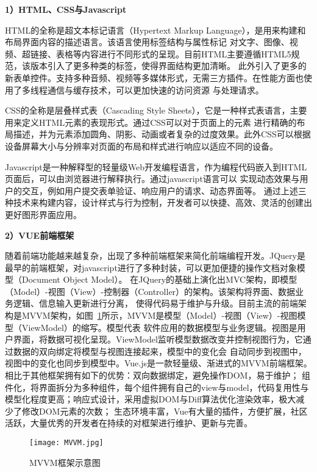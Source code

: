 \textbf{1）HTML、CSS与Javascript}

HTML的全称是超文本标记语言（Hypertext Markup Language），是用来构建和布局界面内容的描述语言。该语言使用标签结构与属性标记
对文字、图像、视频、超链接、表格等内容进行不同形式的呈现。目前HTML主要遵循HTML5规范，该版本引入了更多种类的标签，使得界面结构更加清晰。
此外引入了更多的新表单控件。支持多种音频、视频等多媒体形式，无需三方插件。在性能方面也使用了多线程通信与缓存技术，可以更加快速的访问资源
与处理请求。

CSS的全称是层叠样式表（Cascading Style Sheets），它是一种样式表语言，主要用来定义HTML元素的表现形式。通过CSS可以对于页面上的元素
进行精确的布局描述，并为元素添加圆角、阴影、动画或者复杂的过度效果。此外CSS可以根据设备屏幕大小与分辨率对页面的布局和样式进行响应以适应不同的设备。

Javascript是一种解释型的轻量级Web开发编程语言，作为编程代码嵌入到HTML页面后，可以由浏览器进行解释执行。通过javascript语言可以
实现动态效果与用户的交互，例如用户提交表单验证、响应用户的请求、动态界面等。
通过上述三种技术来构建内容，设计样式与行为控制，开发者可以快捷、高效、灵活的创建出更好图形界面应用。

\textbf{2）VUE前端框架}

随着前端功能越来越复杂，出现了多种前端框架来简化前端编程开发。JQuery是最早的前端框架，对javascript进行了多种封装，可以更加便捷的操作文档对象模型（Document Object Model）。
在JQuery的基础上演化出MVC架构，即模型（Model）-视图（View）-控制器（Controller）的架构。该架构将界面、数据业务逻辑、信息输入更新进行分离，
使得代码易于维护与升级。目前主流的前端架构是MVVM架构，如图~\ref{fig:mvvm}所示，MVVM是模型（Model）-视图（View）-视图模型（ViewModel）的缩写。模型代表
软件应用的数据模型与业务逻辑。视图是用户界面，将数据可视化呈现。ViewModel监听模型数据改变并控制视图行为，它通过数据的双向绑定将模型与视图连接起来，模型中的变化会
自动同步到视图中，视图中的变化也同步到模型中。Vue.js\cite{nelson2018getting}是一款轻量级、渐进式的MVVM前端框架。相比于其他框架拥有如下的优势：双向数据绑定，避免操作DOM，易于维护；
组件化，将界面拆分为多种组件，每个组件拥有自己的view与model，代码复用性与模型化程度更高；响应式设计，采用虚拟DOM与Diff算法优化渲染效率，极大减少了修改DOM元素的次数；
生态环境丰富，Vue有大量的插件，方便扩展，社区活跃，大量优秀的开发者在持续的对框架进行维护、更新与完善。

\begin{figure}[htbp]
  \centering
  \texttt{[image: MVVM.jpg]}
  \caption{MVVM框架示意图}
  \label{fig:mvvm}
\end{figure}

